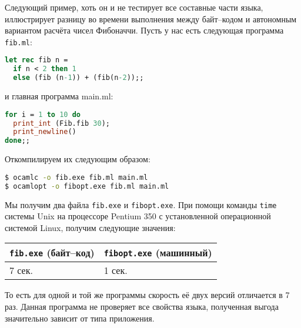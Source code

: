 Следующий пример, хоть он и не тестирует все составные части языка, иллюстрирует
разницу во времени выполнения между байт--кодом и автономным вариантом расчёта
чисел Фибоначчи. Пусть у нас есть следующая программа \texttt{fib.ml}:

\begin{lstlisting}[language=OCaml]
let rec fib n =
  if n < 2 then 1
  else (fib (n-1)) + (fib(n-2));;
\end{lstlisting}

и главная программа main.ml:

\begin{lstlisting}[language=OCaml]
for i = 1 to 10 do
  print_int (Fib.fib 30);
  print_newline()
done;;
\end{lstlisting}

Откомпилируем их следующим образом:

\begin{lstlisting}[language=Bash]
$ ocamlc -o fib.exe fib.ml main.ml
$ ocamlopt -o fibopt.exe fib.ml main.ml
\end{lstlisting}

Мы получим два файла \texttt{fib.exe} и \texttt{fibopt.exe}. При помощи команды
\texttt{time} системы Unix на процессоре Pentium 350 с установленной
операционной системой Linux, получим следующие значения:

\begin{tabular}{|l|l|}
\hline
\texttt{fib.exe} (байт--код) & \texttt{fibopt.exe} (машинный) \\
\hline
7 сек. & 1 сек. \\
\hline
\end{tabular}

То есть для одной и той же программы скорость её двух версий отличается в 7 раз.
Данная программа не проверяет все свойства языка, полученная выгода значительно
зависит от типа приложения.
